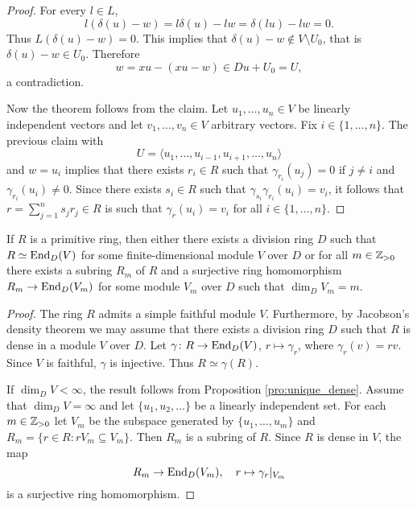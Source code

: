 \begin{proof}
	For every $l\in L$,  
	\[
		l(\delta(u)-w)=l\delta(u)-lw=\delta(lu)-lw=0.
	\]
	Thus $L(\delta(u)-w)=0$. This implies that $\delta(u)-w\not\in V\setminus U_0$, 
	that is $\delta(u)-w\in U_0$. Therefore  
	\[
		w=xu-(xu-w)\in Du+U_0=U,
	\]
	a contradiction.
	
	Now the theorem follows from the claim. Let 
	$u_1,\dots,u_n\in V$ be linearly independent vectors and let 
	$v_1,\dots,v_n\in V$ arbitrary vectors. Fix $i\in\{1,\dots,n\}$. 
	The previous claim with 
	\[
		U=\langle u_1,\dots,u_{i-1},u_{i+1},\dots,u_n\rangle
	\]
	and $w=u_i$ implies that there exists $r_i\in R$ such that $\gamma_{r_i}(u_j)=0$ if 
	$j\ne i$ and $\gamma_{r_i}(u_i)\ne 0$. Since there exists $s_i\in R$ such that 
	$\gamma_{s_i}\gamma_{r_i}(u_i)=v_i$, it follows that 
	$r=\sum_{j=1}^n s_jr_j\in R$ is such that $\gamma_r(u_i)=v_i$ for all 
	$i\in\{1,\dots,n\}$.
\end{proof}


\begin{corollary}
	If $R$ is a primitive ring, then either there exists a division ring $D$
	such that $R\simeq\operatorname{End}_D(V)$ for some finite-dimensional module $V$ over $D$ or 
	for all $m\in\mathbb{Z}_{>0}$ there exists a subring $R_m$ of 
	$R$ and a surjective ring homomorphism $R_m\to\operatorname{End}_D(V_m)$ for some module 
	$V_m$ over $D$ such that $\dim_DV_m=m$.
\end{corollary}

\begin{proof}
	The ring $R$ admits a simple faithful module $V$. Furthermore, by Jacobson's density 
	theorem we may assume that there exists a division ring $D$ 
	such that $R$ is dense in a module $V$ over $D$. 
	Let $\gamma\colon R\to\operatorname{End}_D(V)$, $r\mapsto\gamma_r$, where 
	$\gamma_r(v)=rv$. Since $V$ is faithful, $\gamma$ is injective. Thus 
	$R\simeq\gamma(R)$. 

	If $\dim_DV<\infty$, the result follows from Proposition \ref{pro:unique_dense}. 
	Assume that $\dim_DV=\infty$ and let $\{u_1,u_2,\dots\}$ be a linearly independent set. 
	For each $m\in\mathbb{Z}_{>0}$ let $V_m$ be the subspace generated by $\{u_1,\dots,u_m\}$
	and $R_m=\{r\in R:rV_m\subseteq V_m\}$. Then $R_m$ is a subring of $R$. 
	Since $R$ is dense in $V$, the map 
	\[
		R_m\to \operatorname{End}_D(V_m),\quad
		r\mapsto\gamma_r|_{V_m}
	\]
	is a surjective ring homomorphism. 
\end{proof}

